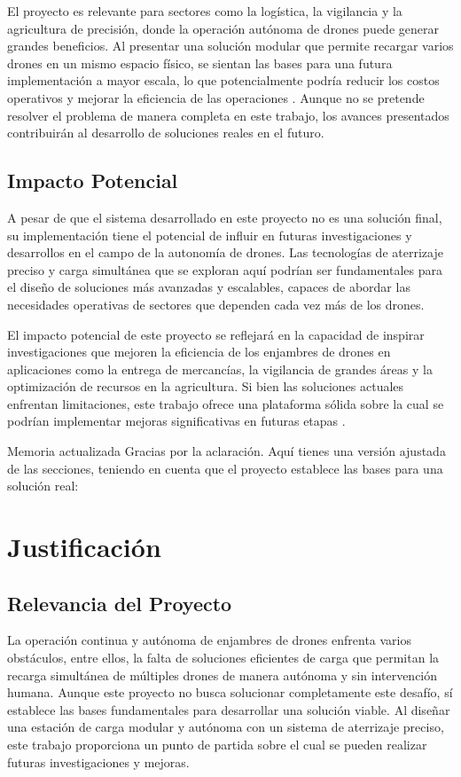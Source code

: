 El proyecto es relevante para sectores como la logística, la vigilancia y la agricultura de precisión, donde la operación autónoma de drones puede generar grandes beneficios. Al presentar una solución modular que permite recargar varios drones en un mismo espacio físico, se sientan las bases para una futura implementación a mayor escala, lo que potencialmente podría reducir los costos operativos y mejorar la eficiencia de las operaciones \cite{cite1}. Aunque no se pretende resolver el problema de manera completa en este trabajo, los avances presentados contribuirán al desarrollo de soluciones reales en el futuro.

\subsection{Impacto Potencial}

A pesar de que el sistema desarrollado en este proyecto no es una solución final, su implementación tiene el potencial de influir en futuras investigaciones y desarrollos en el campo de la autonomía de drones. Las tecnologías de aterrizaje preciso y carga simultánea que se exploran aquí podrían ser fundamentales para el diseño de soluciones más avanzadas y escalables, capaces de abordar las necesidades operativas de sectores que dependen cada vez más de los drones.

El impacto potencial de este proyecto se reflejará en la capacidad de inspirar investigaciones que mejoren la eficiencia de los enjambres de drones en aplicaciones como la entrega de mercancías, la vigilancia de grandes áreas y la optimización de recursos en la agricultura. Si bien las soluciones actuales enfrentan limitaciones, este trabajo ofrece una plataforma sólida sobre la cual se podrían implementar mejoras significativas en futuras etapas \cite{cite2}.


Memoria actualizada
Gracias por la aclaración. Aquí tienes una versión ajustada de las secciones, teniendo en cuenta que el proyecto establece las bases para una solución real:

\section{Justificación}

\subsection{Relevancia del Proyecto}

La operación continua y autónoma de enjambres de drones enfrenta varios obstáculos, entre ellos, la falta de soluciones eficientes de carga que permitan la recarga simultánea de múltiples drones de manera autónoma y sin intervención humana. Aunque este proyecto no busca solucionar completamente este desafío, sí establece las bases fundamentales para desarrollar una solución viable. Al diseñar una estación de carga modular y autónoma con un sistema de aterrizaje preciso, este trabajo proporciona un punto de partida sobre el cual se pueden realizar futuras investigaciones y mejoras.


